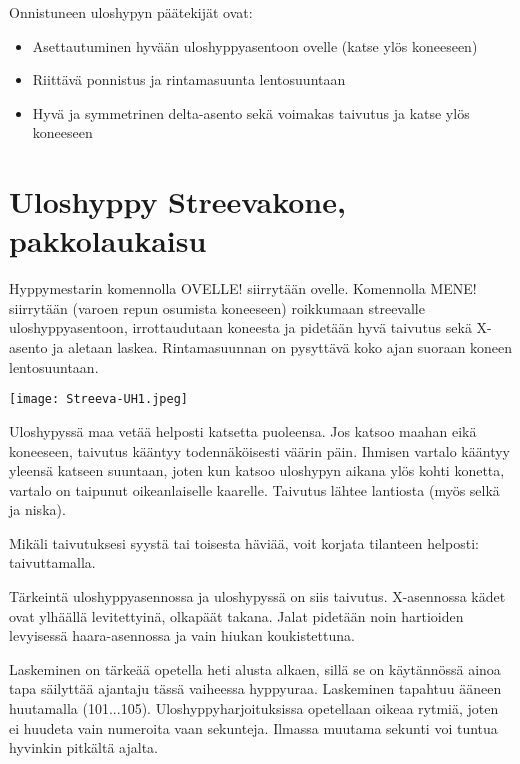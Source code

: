 Onnistuneen uloshypyn päätekijät ovat: 

\begin{itemize}
\item  Asettautuminen hyvään uloshyppyasentoon ovelle (katse ylös koneeseen) 
\item  Riittävä ponnistus ja rintamasuunta lentosuuntaan  
\item  Hyvä ja symmetrinen delta-asento sekä voimakas taivutus ja katse ylös koneeseen 
\end{itemize}
\section{ Uloshyppy Streevakone, pakkolaukaisu }
\label{hyppytapahtuma-uloshyppy-streevakone-pakkolaukaisu}


Hyppymestarin komennolla OVELLE! siirrytään ovelle. Komennolla MENE! siirrytään (varoen repun osumista koneeseen) roikkumaan streevalle uloshyppyasentoon, irrottaudutaan koneesta ja pidetään hyvä taivutus sekä X-asento ja aletaan laskea. Rintamasuunnan on pysyttävä koko ajan suoraan koneen lentosuuntaan. 


\begin{Figure}\centering\texttt{[image: Streeva-UH1.jpeg]}\end{Figure} 


Uloshypyssä maa vetää helposti katsetta puoleensa. Jos katsoo maahan eikä koneeseen, taivutus kääntyy todennäköisesti väärin päin. Ihmisen vartalo kääntyy yleensä katseen suuntaan, joten kun katsoo uloshypyn aikana ylös kohti konetta, vartalo on taipunut oikeanlaiselle kaarelle. Taivutus lähtee lantiosta (myös selkä ja niska). 


Mikäli taivutuksesi syystä tai toisesta häviää, voit korjata tilanteen helposti: taivuttamalla. 


Tärkeintä uloshyppyasennossa ja uloshypyssä on siis taivutus. X-asennossa kädet ovat ylhäällä levitettyinä, olkapäät takana. Jalat pidetään noin hartioiden levyisessä haara-asennossa ja vain hiukan koukistettuna. 


Laskeminen on tärkeää opetella heti alusta alkaen, sillä se on käytännössä ainoa tapa säilyttää ajantaju tässä vaiheessa hyppyuraa. Laskeminen tapahtuu ääneen huutamalla (101...105). Uloshyppyharjoituksissa opetellaan oikeaa rytmiä, joten ei huudeta vain numeroita vaan sekunteja. Ilmassa muutama sekunti voi tuntua hyvinkin pitkältä ajalta. 


